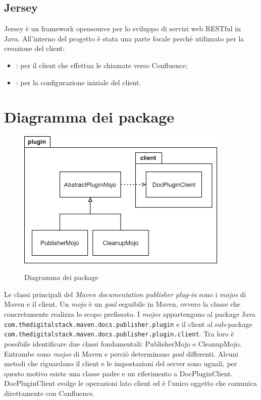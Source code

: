 \subsection{Jersey} %
Jersey è un framework opensource per lo sviluppo di servizi web RESTful in Java.
All'interno del progetto è stata una parte focale perché utilizzato per la creazione del client:
\begin{itemize}
    \item {}: per il client che effettua le chiamate verso Confluence;
    \item {}: per la configurazione iniziale del client.
\end{itemize}



\section{Diagramma dei package} %
\label{sec:diagramma-package}
\begin{figure}[H]
    \centering
    \includegraphics[width=0.9\textwidth]{immagini/PackageDiagram.png}\\
    \caption{Diagramma dei package}
\end{figure}
Le classi principali del \emph{Maven documentation publisher plug-in} sono i \emph{mojos} di Maven e il client.
Un \emph{mojo} è un \emph{goal} esguibile in Maven, ovvero la classe che concretamente realizza lo scopo prefissato.
I \emph{mojos} appartengono al package Java \texttt{com.thedigitalstack.maven.docs.publisher.plugin} e il client al sub-package\\ \texttt{com.thedigitalstack.maven.docs.publisher.plugin.client}.
Tra loro è possibile identificare due classi fondamentali: PublisherMojo e CleanupMojo.
Entrambe sono \emph{mojos} di Maven e perciò determinano \emph{goal} differenti.
Alcuni metodi che riguardano il client e le impostazioni del server sono uguali, per questo motivo esiste una classe padre e un riferimento a DocPluginClient.
DocPluginClient svolge le operazioni lato client ed è l'unico oggetto che comunica direttamente con Confluence.



